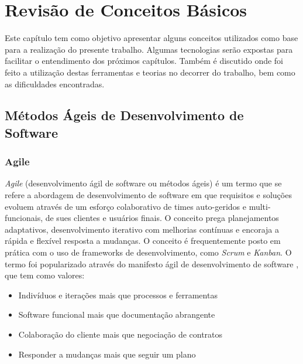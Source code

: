 \chapter{Revisão de Conceitos Básicos} \label{cap:concepts}
Este capítulo tem como objetivo apresentar alguns conceitos utilizados como base para a realização do presente trabalho. Algumas tecnologias serão expostas para facilitar o entendimento dos próximos capítulos. Também é discutido onde foi feito a utilização destas ferramentas e teorias no decorrer do trabalho, bem como as dificuldades encontradas.
\section{Métodos Ágeis de Desenvolvimento de Software}

\subsection{Agile}
\textit{Agile} (desenvolvimento ágil de software ou métodos ágeis) é um termo que se refere a abordagem de desenvolvimento de software em que requisitos e soluções evoluem através de um esforço colaborativo de times auto-geridos e multi-funcionais, de sues clientes e usuários finais. O conceito prega planejamentos adaptativos, desenvolvimento iterativo com melhorias contínuas e encoraja a rápida e flexível resposta a mudanças. O conceito é frequentemente posto em prática com o uso de frameworks de desenvolvimento, como \textit{Scrum} e \textit{Kanban}. O termo foi popularizado através do manifesto ágil de desenvolvimento de software \cite{agile-manifet}, que tem como valores:

\begin{itemize}
    \item Indivíduos e iterações mais que processos e ferramentas
    \item Software funcional mais que documentação abrangente
    \item Colaboração do cliente mais que negociação de contratos
    \item Responder a mudanças mais que seguir um plano
\end{itemize}

